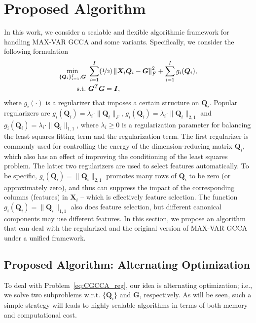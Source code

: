 \documentclass[10pt,journal]{IEEEtran}
\newcommand{\G}{\boldsymbol{G}}
\newcommand{\Q}{\boldsymbol{Q}}
\newcommand{\X}{\boldsymbol{X}}
\begin{document}
\section{Proposed Algorithm}
In this work, we consider a scalable and flexible algorithmic framework for handling MAX-VAR GCCA and some variants. Specifically, we consider the following formulation
\begin{equation}\label{eq:CGCCA_reg}
\begin{aligned}
\min_{\{{\bm Q}_i\}_{i=1}^I,\G} &~\sum_{i=1}^{I}(\nicefrac{1}{2})\left\|{\bm X}_i{\bm Q}_i-{\bm G}\right\|_F^2+\sum_{i=1}^I  g_i(\Q_i),\\
{\rm s.t.}&~{\bm G}^T{\bm G}={\bm I},
\end{aligned}
\end{equation}
where $g_i(\cdot)$ is a regularizer that imposes a certain structure on $\Q_i$.
Popular regularizers are $g_i(\Q_i)=\lambda_i\cdot\|\Q_i\|_{F}$, $g_i(\Q_i)=\lambda_i\cdot\|\Q_i\|_{2,1}$ and $g_i(\Q_i)=\lambda_i\cdot\|\Q_i\|_{1,1}$, where $\lambda_i\geq 0$ is a regularization parameter for balancing the least squares fitting term and the regularization term.
The first regularizer is commonly used for controlling the energy of the dimension-reducing matrix $\Q_i$, which also has an effect of improving the conditioning of the least squares problem.
The latter two regularizers are used to select features automatically. To be specific,  $g_i(\Q_i)=\|\Q_i\|_{2,1}$ promotes many rows of $\Q_i$ to be zero (or approximately zero), and thus can suppress the impact of the corresponding columns (features) in $\X_i$ -- which is effectively feature selection.
The function $g_i(\Q_i)=\|\Q_i\|_{1,1}$ also does feature selection, but different canonical components may use different features.
In this section, we propose an algorithm that can deal with the regularized and the original version of MAX-VAR GCCA under a unified framework.

\subsection{Proposed Algorithm: Alternating Optimization}
To deal with Problem~\eqref{eq:CGCCA_reg}, our idea is alternating optimization; i.e.,
we solve two subproblems w.r.t. $\{\Q_i\}$ and $\G$, respectively.
As will be seen, such a simple strategy will leads to highly scalable algorithms in terms of both memory and computational cost.
\end{document}
